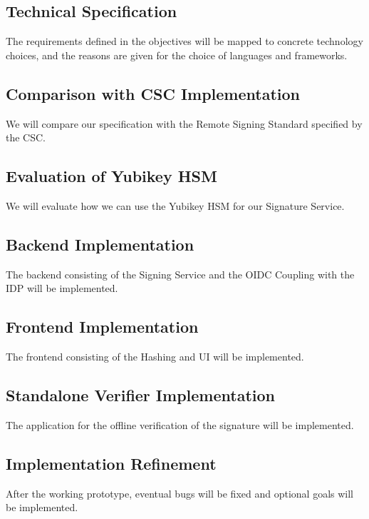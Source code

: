 \subsection{Technical Specification}\label{subsec:technical-specification}
The requirements defined in the objectives will be mapped to concrete technology choices,
and the reasons are given for the choice of languages and frameworks.

\subsection{Comparison with CSC Implementation}\label{subsec:comparison-with-csc-implementation}
We will compare our specification with the Remote Signing Standard specified by the \gls{CSC}.

\subsection{Evaluation of Yubikey HSM}\label{subsec:evaluation-of-yubikey-hsm}
We will evaluate how we can use the Yubikey HSM for our Signature Service.

\subsection{Backend Implementation}\label{subsec:backend-implementation}
The backend consisting of the Signing Service and the OIDC Coupling with the IDP will be implemented.

\subsection{Frontend Implementation}\label{subsec:frontend-implementation}
The frontend consisting of the Hashing and UI will be implemented.

\subsection{Standalone Verifier Implementation}\label{subsec:standalone-verifier-implementation}
The application for the offline verification of the signature will be implemented.

\subsection{Implementation Refinement}\label{subsec:implementation-refinement}
After the working prototype, eventual bugs will be fixed and optional goals will be implemented.

